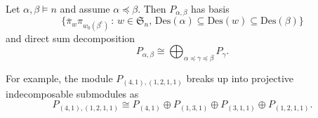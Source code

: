 \documentclass[ALCO,ThmDefs,published]{cedram}
\newcommand{\symm}{{\mathfrak{S}}}
\newcommand{\FF}{{\mathbb{F}}}
\theoremstyle{plain}
\newcommand{\Des}{{\mathrm {Des}}}
\newcommand{\symm}{{\mathfrak{S}}}
\newcommand{\FF}{{\mathbb{F}}}
\newcommand{\pib}{\overline{\pi}}
\newcommand{\edit}[1]{{\color{red}{\bf {#1}}}}
\begin{document}
\begin{lemma}
\label{alpha-beta-structure}
Let $\alpha, \beta \models n$ and assume $\alpha \preceq \beta$.  
Then $P_{\alpha,\beta}$ has basis
\begin{equation}
\label{ab-basis}
\{ \pib_w \pi_{w_0(\beta^c)} \,:\, w \in \symm_n, \, \Des(\alpha) \subseteq \Des(w) \subseteq \Des(\beta) \}
\end{equation}
and direct sum decomposition
\begin{equation}
P_{\alpha,\beta} \cong \bigoplus_{\alpha\preceq \gamma\preceq \beta} P_{\gamma}.
\end{equation}
\end{lemma}

{For example, the module $P_{(4,1),(1,2,1,1)}$ breaks up into projective indecomposable submodules as
\[P_{(4,1),(1,2,1,1)} \cong P_{(4,1)} \oplus P_{(1,3,1)} \oplus P_{(3,1,1)} \oplus P_{(1,2,1,1)}.\]}

\end{document}
